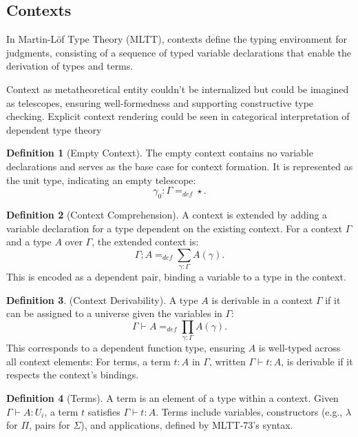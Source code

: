 \documentclass{article}
\theoremstyle{definition}
\newtheorem{definition}{Definition}
\begin{document}
\subsection*{Contexts}
In Martin-Löf Type Theory (MLTT), contexts define the typing
environment for judgments, consisting of a sequence of typed
variable declarations that enable the derivation of types and
terms.

Context as metatheoretical entity couldn't be internalized but could be
imagined as telescopes, ensuring well-formedness and supporting
constructive type checking. Explicit context rendering could be
seen in categorical interpretation of dependent type theory

\begin{definition}[Empty Context]
The empty context contains no variable declarations and serves as the base case for context formation.
It is represented as the unit type, indicating an empty telescope:
\[
\gamma_0 : \Gamma =_{def} \star.
\]
\end{definition}

\begin{definition}[Context Comprehension]
A context is extended by adding a variable declaration for a
type dependent on the existing context. For a context \( \Gamma \)
and a type \( A \) over \( \Gamma \), the extended context is:
\[
\Gamma ; A =_{def} \sum_{\gamma:\Gamma}A(\gamma).
\]
This is encoded as a dependent pair,
binding a variable to a type in the context.
\end{definition}

\begin{definition} (Context Derivability).
A type \( A \) is derivable in a context \( \Gamma \) if it can be
assigned to a universe given the variables in \( \Gamma \):
\[
\Gamma \vdash A =_{def} \prod_{\gamma:\Gamma}A(\gamma).
\]
This corresponds to a dependent function type,
ensuring \( A \) is well-typed across all context elements:
For terms, a term \( t : A \) in \( \Gamma \), written \( \Gamma \vdash t : A \),
is derivable if it respects the context’s bindings.
\end{definition}

\begin{definition}[Terms]
A term is an element of a type within a context.
Given \( \Gamma \vdash A : U_i \), a term \( t \)
satisfies \( \Gamma \vdash t : A \). Terms include
variables, constructors (e.g., \( \lambda \) for \( \Pi \),
pairs for \( \Sigma \)), and applications, defined by MLTT-73’s
syntax.
\end{definition}
\end{document}
